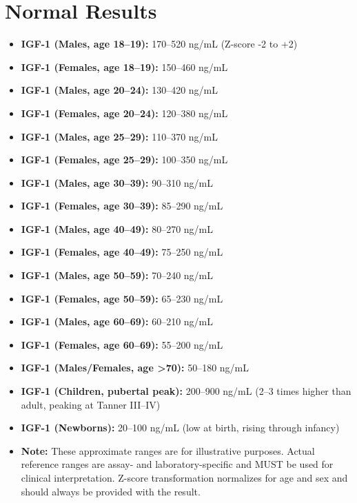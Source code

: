\section*{Normal Results}
\begin{itemize}
  \item \textbf{IGF-1 (Males, age 18--19):} 170--520 ng/mL (Z-score -2 to +2)
  \item \textbf{IGF-1 (Females, age 18--19):} 150--460 ng/mL
  \item \textbf{IGF-1 (Males, age 20--24):} 130--420 ng/mL
  \item \textbf{IGF-1 (Females, age 20--24):} 120--380 ng/mL
  \item \textbf{IGF-1 (Males, age 25--29):} 110--370 ng/mL
  \item \textbf{IGF-1 (Females, age 25--29):} 100--350 ng/mL
  \item \textbf{IGF-1 (Males, age 30--39):} 90--310 ng/mL
  \item \textbf{IGF-1 (Females, age 30--39):} 85--290 ng/mL
  \item \textbf{IGF-1 (Males, age 40--49):} 80--270 ng/mL
  \item \textbf{IGF-1 (Females, age 40--49):} 75--250 ng/mL
  \item \textbf{IGF-1 (Males, age 50--59):} 70--240 ng/mL
  \item \textbf{IGF-1 (Females, age 50--59):} 65--230 ng/mL
  \item \textbf{IGF-1 (Males, age 60--69):} 60--210 ng/mL
  \item \textbf{IGF-1 (Females, age 60--69):} 55--200 ng/mL
  \item \textbf{IGF-1 (Males/Females, age >70):} 50--180 ng/mL
  \item \textbf{IGF-1 (Children, pubertal peak):} 200--900 ng/mL (2--3 times higher than adult, peaking at Tanner III--IV)
  \item \textbf{IGF-1 (Newborns):} 20--100 ng/mL (low at birth, rising through infancy)
  \item \textbf{Note:} These approximate ranges are for illustrative purposes. Actual reference ranges are assay- and laboratory-specific and MUST be used for clinical interpretation. Z-score transformation normalizes for age and sex and should always be provided with the result.
\end{itemize}


